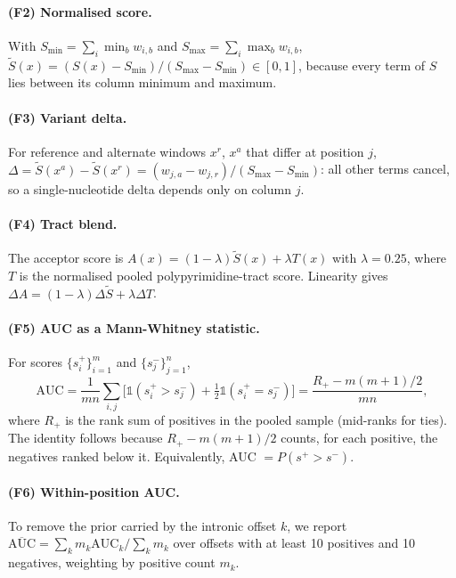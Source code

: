\documentclass[11pt]{article}
\begin{document}
\paragraph{(F2) Normalised score.} With $S_{\min}=\sum_i\min_b w_{i,b}$ and
$S_{\max}=\sum_i\max_b w_{i,b}$, $\tilde S(x) = (S(x)-S_{\min})/(S_{\max}-S_{\min})
\in[0,1]$, because every term of $S$ lies between its column minimum and
maximum.

\paragraph{(F3) Variant delta.} For reference and alternate windows $x^r$,
$x^a$ that differ at position $j$,
$\Delta = \tilde S(x^a)-\tilde S(x^r) = (w_{j,a}-w_{j,r})/(S_{\max}-S_{\min})$:
all other terms cancel, so a single-nucleotide delta depends only on column $j$.

\paragraph{(F4) Tract blend.} The acceptor score is
$A(x) = (1-\lambda)\tilde S(x) + \lambda T(x)$ with $\lambda = 0.25$, where
$T$ is the normalised pooled polypyrimidine-tract score. Linearity gives
$\Delta A = (1-\lambda)\Delta\tilde S + \lambda \Delta T$.

\paragraph{(F5) AUC as a Mann-Whitney statistic.} For scores
$\{s^+_i\}_{i=1}^{m}$ and $\{s^-_j\}_{j=1}^{n}$,
\begin{equation}
\mathrm{AUC} = \frac{1}{mn}\sum_{i,j}\Big[\mathbb{1}(s^+_i>s^-_j)+\tfrac12\mathbb{1}(s^+_i=s^-_j)\Big]
= \frac{R_+ - m(m+1)/2}{mn},
\end{equation}
where $R_+$ is the rank sum of positives in the pooled sample (mid-ranks for
ties). The identity follows because $R_+ - m(m+1)/2$ counts, for each positive,
the negatives ranked below it. Equivalently, AUC $=P(s^+>s^-)$.

\paragraph{(F6) Within-position AUC.} To remove the prior carried by the
intronic offset $k$, we report $\overline{\mathrm{AUC}} =
\sum_k m_k \mathrm{AUC}_k / \sum_k m_k$ over offsets with at least 10
positives and 10 negatives, weighting by positive count $m_k$.
\end{document}
